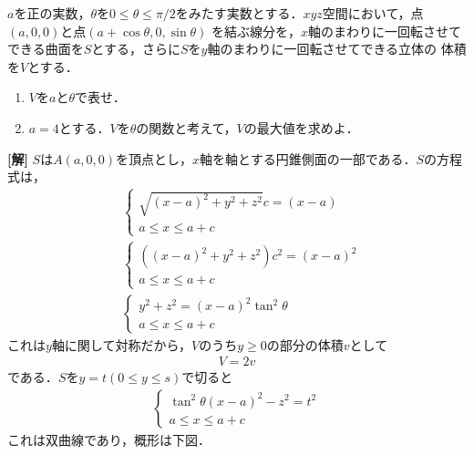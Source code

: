 \documentclass[a4j]{jarticle}
\begin{document}

     \begin{oframed}
     $a$を正の実数，$\theta$を$0\le\theta\le\pi/2$をみたす実数とする．$xyz$空間において，点$(a,0,0)$と点$(a+\cos\theta,0,\sin\theta)$
     を結ぶ線分を，$x$軸のまわりに一回転させてできる曲面を$S$とする，さらに$S$を$y$軸のまわりに一回転させてできる立体の
     体積を$V$とする．
          \begin{enumerate}[(1)]
          \item $V$を$a$と$\theta$で表せ．
          \item $a=4$とする．$V$を$\theta$の関数と考えて，$V$の最大値を求めよ．
          \end{enumerate}
     \end{oframed}

\setlength{\columnseprule}{0.4pt}
\begin{multicols}{2}
{\bf[解]} \1 $S$は$A(a,0,0)$を頂点とし，$x$軸を軸とする円錐側面の一部である．$S$の方程式は，
     \begin{align*}
          &\begin{cases}
          \sqrt{(x-a)^2+y^2+z^2}c=(x-a) \\
          a\le x\le a+c  
          \end{cases} \\
          &\begin{cases}
          ((x-a)^2+y^2+z^2)c^2=(x-a)^2 \\
          a\le x\le a+c 
          \end{cases} \\
          &\begin{cases}
          y^2+z^2=(x-a)^2\tan^2\theta \\
          a\le x\le a+c
          \end{cases} 
     \end{align*}
これは$y$軸に関して対称だから，$V$のうち$y\ge0$の部分の体積$v$として
     \begin{align}
     V=2v\label{1}
     \end{align}
である．$S$を$y=t(0\le y\le s)$で切ると
     \begin{align}
          \begin{cases}
          \tan^2\theta(x-a)^2-z^2=t^2 \\
          a\le x\le a+c
          \end{cases}
     \end{align}
これは双曲線であり，概形は下図．
     \begin{center}
     \scalebox{1}{a}
     \end{center}     

\end{multicols}
\end{document}
